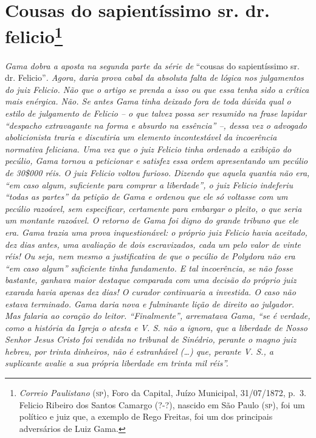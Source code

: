 \chapter{Cousas do sapientíssimo sr. dr. felicio\footnote{\emph{Correio Paulistano} (\textsc{sp}), Foro da Capital, Juízo
  Municipal, 31/07/1872, p.~3. Felicio Ribeiro dos Santos Camargo (?-?),
  nascido em São Paulo (\textsc{sp}), foi um político e juiz que, a exemplo de
  Rego Freitas, foi um dos principais adversários de Luiz Gama.}} %

\begin{didascalia}
\emph{Gama dobra a aposta na segunda parte da série de} ``cousas do
sapientíssimo sr. dr. Felicio''\emph{. Agora, daria prova cabal da
absoluta falta de lógica nos julgamentos do juiz Felicio. Não que o
artigo se prenda a isso ou que essa tenha sido a crítica mais enérgica.
Não. Se antes Gama tinha deixado fora de toda dúvida qual o estilo de
julgamento de Felicio -- o que talvez possa ser resumido na frase
lapidar ``despacho extravagante na forma e absurdo na essência'' --, dessa
vez o advogado abolicionista traria e discutiria um elemento
incontestável da incoerência normativa feliciana. Uma vez que o juiz
Felicio tinha ordenado a exibição do pecúlio, Gama tornou a peticionar e
satisfez essa ordem apresentando um pecúlio de 30\$000 réis. O juiz
Felicio voltou furioso. Dizendo que aquela quantia não era, ``em caso
algum, suficiente para comprar a liberdade'', o juiz Felicio indeferiu
``todas as partes'' da petição de Gama e ordenou que ele só voltasse com
um pecúlio razoável, sem especificar, certamente para embargar o pleito,
o que seria um montante razoável. O retorno de Gama foi digno do grande
tribuno que ele era. Gama trazia uma prova inquestionável: o próprio
juiz Felicio havia aceitado, dez dias antes, uma avaliação de dois
escravizados, cada um pelo valor de vinte réis! Ou seja, nem mesmo a
justificativa de que o pecúlio de Polydora não era ``em caso algum''
suficiente tinha fundamento. E tal incoerência, se não fosse bastante,
ganhava maior destaque comparada com uma decisão do próprio juiz exarada
havia apenas dez dias! O curador continuaria a investida. O caso não
estava terminado. Gama daria nova e fulminante lição de direito ao
julgador. Mas falaria ao coração do leitor. ``Finalmente'', arrematava
Gama, ``se é verdade, como a história da Igreja o atesta e V. S. não a
ignora, que a liberdade de Nosso Senhor Jesus Cristo foi vendida no
tribunal de Sinédrio, perante o magno juiz hebreu, por trinta dinheiros,
não é estranhável (\ldots{}) que, perante V. S., a suplicante avalie a sua
própria liberdade em trinta mil réis''.}
\end{didascalia}


